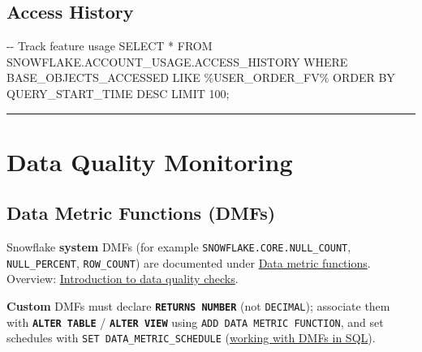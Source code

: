\documentclass[
  letterpaper,
  DIV=11,
  numbers=noendperiod]{scrreprt}
\newenvironment{Shaded}{\begin{snugshade}}{\end{snugshade}}
\newcommand{\CommentTok}[1]{\textcolor[rgb]{0.37,0.37,0.37}{#1}}
\newcommand{\DecValTok}[1]{\textcolor[rgb]{0.68,0.00,0.00}{#1}}
\newcommand{\KeywordTok}[1]{\textcolor[rgb]{0.00,0.23,0.31}{#1}}
\newcommand{\NormalTok}[1]{\textcolor[rgb]{0.00,0.23,0.31}{#1}}
\newcommand{\OperatorTok}[1]{\textcolor[rgb]{0.37,0.37,0.37}{#1}}
\newcommand{\StringTok}[1]{\textcolor[rgb]{0.13,0.47,0.30}{#1}}
\begin{document}
\hypertarget{access-history}{%
\subsection{Access History}\label{access-history}}

\begin{Shaded}
\begin{Highlighting}[]
\CommentTok{{-}{-} Track feature usage}
\KeywordTok{SELECT} \OperatorTok{*}
\KeywordTok{FROM}\NormalTok{ SNOWFLAKE.ACCOUNT\_USAGE.ACCESS\_HISTORY}
\KeywordTok{WHERE}\NormalTok{ BASE\_OBJECTS\_ACCESSED }\KeywordTok{LIKE} \StringTok{\textquotesingle{}\%USER\_ORDER\_FV\%\textquotesingle{}}
\KeywordTok{ORDER} \KeywordTok{BY}\NormalTok{ QUERY\_START\_TIME }\KeywordTok{DESC}
\KeywordTok{LIMIT} \DecValTok{100}\NormalTok{;}
\end{Highlighting}
\end{Shaded}

\begin{center}\rule{0.5\linewidth}{0.5pt}\end{center}

\hypertarget{data-quality-monitoring}{%
\section{Data Quality Monitoring}\label{data-quality-monitoring}}

\hypertarget{data-metric-functions-dmfs}{%
\subsection{Data Metric Functions
(DMFs)}\label{data-metric-functions-dmfs}}

Snowflake \textbf{system} DMFs (for example
\texttt{SNOWFLAKE.CORE.NULL\_COUNT}, \texttt{NULL\_PERCENT},
\texttt{ROW\_COUNT}) are documented under
\href{https://docs.snowflake.com/en/sql-reference/functions-data-metric}{Data
metric functions}. Overview:
\href{https://docs.snowflake.com/en/user-guide/data-quality-intro}{Introduction
to data quality checks}.

\textbf{Custom} DMFs must declare \textbf{\texttt{RETURNS\ NUMBER}} (not
\texttt{DECIMAL}); associate them with \textbf{\texttt{ALTER\ TABLE}} /
\textbf{\texttt{ALTER\ VIEW}} using
\texttt{ADD\ DATA\ METRIC\ FUNCTION}, and set schedules with
\texttt{SET\ DATA\_METRIC\_SCHEDULE}
(\href{https://docs.snowflake.com/en/user-guide/data-quality-working}{working
with DMFs in SQL}).
\end{document}
